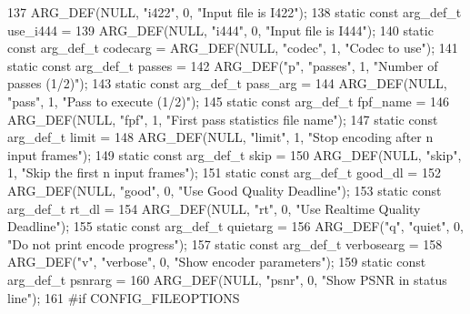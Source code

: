 \begin{DoxyCodeInclude}
{{137     ARG\_DEF(NULL, \textcolor{stringliteral}{"i422"}, 0, \textcolor{stringliteral}{"Input file is I422"});
138 \textcolor{keyword}{static} \textcolor{keyword}{const} arg\_def\_t use\_i444 =
139     ARG\_DEF(NULL, \textcolor{stringliteral}{"i444"}, 0, \textcolor{stringliteral}{"Input file is I444"});
140 \textcolor{keyword}{static} \textcolor{keyword}{const} arg\_def\_t codecarg = ARG\_DEF(NULL, \textcolor{stringliteral}{"codec"}, 1, \textcolor{stringliteral}{"Codec to use"});
141 \textcolor{keyword}{static} \textcolor{keyword}{const} arg\_def\_t passes =
142     ARG\_DEF(\textcolor{stringliteral}{"p"}, \textcolor{stringliteral}{"passes"}, 1, \textcolor{stringliteral}{"Number of passes (1/2)"});
143 \textcolor{keyword}{static} \textcolor{keyword}{const} arg\_def\_t pass\_arg =
144     ARG\_DEF(NULL, \textcolor{stringliteral}{"pass"}, 1, \textcolor{stringliteral}{"Pass to execute (1/2)"});
145 \textcolor{keyword}{static} \textcolor{keyword}{const} arg\_def\_t fpf\_name =
146     ARG\_DEF(NULL, \textcolor{stringliteral}{"fpf"}, 1, \textcolor{stringliteral}{"First pass statistics file name"});
147 \textcolor{keyword}{static} \textcolor{keyword}{const} arg\_def\_t limit =
148     ARG\_DEF(NULL, \textcolor{stringliteral}{"limit"}, 1, \textcolor{stringliteral}{"Stop encoding after n input frames"});
149 \textcolor{keyword}{static} \textcolor{keyword}{const} arg\_def\_t skip =
150     ARG\_DEF(NULL, \textcolor{stringliteral}{"skip"}, 1, \textcolor{stringliteral}{"Skip the first n input frames"});
151 \textcolor{keyword}{static} \textcolor{keyword}{const} arg\_def\_t good\_dl =
152     ARG\_DEF(NULL, \textcolor{stringliteral}{"good"}, 0, \textcolor{stringliteral}{"Use Good Quality Deadline"});
153 \textcolor{keyword}{static} \textcolor{keyword}{const} arg\_def\_t rt\_dl =
154     ARG\_DEF(NULL, \textcolor{stringliteral}{"rt"}, 0, \textcolor{stringliteral}{"Use Realtime Quality Deadline"});
155 \textcolor{keyword}{static} \textcolor{keyword}{const} arg\_def\_t quietarg =
156     ARG\_DEF(\textcolor{stringliteral}{"q"}, \textcolor{stringliteral}{"quiet"}, 0, \textcolor{stringliteral}{"Do not print encode progress"});
157 \textcolor{keyword}{static} \textcolor{keyword}{const} arg\_def\_t verbosearg =
158     ARG\_DEF(\textcolor{stringliteral}{"v"}, \textcolor{stringliteral}{"verbose"}, 0, \textcolor{stringliteral}{"Show encoder parameters"});
159 \textcolor{keyword}{static} \textcolor{keyword}{const} arg\_def\_t psnrarg =
160     ARG\_DEF(NULL, \textcolor{stringliteral}{"psnr"}, 0, \textcolor{stringliteral}{"Show PSNR in status line"});
161 \textcolor{preprocessor}{#if CONFIG\_FILEOPTIONS}
}}
\end{DoxyCodeInclude}
